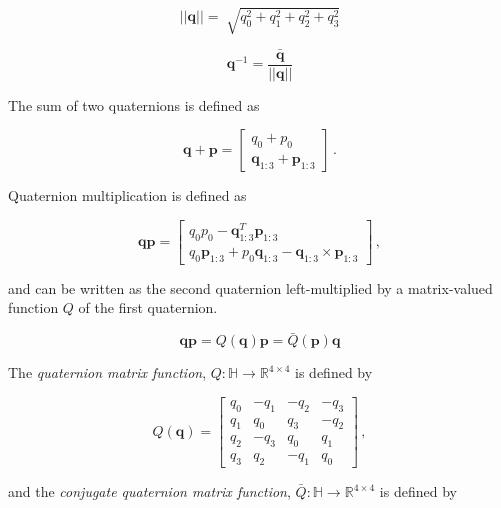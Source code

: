 \begin{equation}
  ||\mathbf{q}|| = \sqrt[]{q_0^2 + q_1^2 + q_2^2 + q_3^2}
\end{equation}

\begin{equation}
	\mathbf{q}^{-1} = \frac{\bar{\mathbf{q}}}{||\mathbf{q}||}
\end{equation}

\noindent
The sum of two quaternions is defined as

\begin{equation}
  \mathbf{q} + \mathbf{p} = \begin{bmatrix}
  	q_0 + p_0 \\ \mathbf{q}_{1:3} + \mathbf{p}_{1:3}
  \end{bmatrix}\,.
\end{equation}

\noindent
Quaternion multiplication is defined as

\begin{equation}
  \mathbf{q} \mathbf{p} = \begin{bmatrix}
  	q_0 p_0 -\mathbf{q}^T_{1:3} \mathbf{p}_{1:3}\\
  	q_0 \mathbf{p}_{1:3} + p_0 \mathbf{q}_{1:3} - \mathbf{q}_{1:3} \times \mathbf{p}_{1:3}
  \end{bmatrix}\,,
\end{equation}

\noindent
and can be written as the second quaternion left-multiplied by a matrix-valued function $Q$ of the first quaternion.

\begin{equation}
  \mathbf{q} \mathbf{p} = Q(\mathbf{q}) \mathbf{p} = \bar{Q}(\mathbf{p}) \mathbf{q}
\end{equation}

\noindent
The \emph{quaternion matrix function}, $Q : \mathbb{H} \rightarrow \mathbb{R}^{4\times4}$ is defined by

\begin{equation}
	Q(\mathbf{q}) = \begin{bmatrix}
 q_0 & -q_1 & -q_2 & -q_3\\
 q_1 & q_0 & q_3 & -q_2\\
 q_2 & -q_3 & q_0 & q_1 \\
 q_3 & q_2 & -q_1 & q_0
\end{bmatrix}\,,
\end{equation}

\noindent
and the \emph{conjugate quaternion matrix function}, $\bar{Q} : \mathbb{H} \rightarrow \mathbb{R}^{4\times4}$ is defined by

